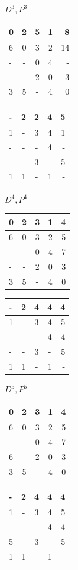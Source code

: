 \documentclass[a4paper,12pt]{article}
\begin{document}
$D^3, P^3$

\begin{tabular}{ | l | c | c | c | r | }
  \hline
  0 & 2 & 5 & 1 & 8 \\ \hline
  6 & 0 & 3 & 2 & 14 \\ \hline
  - & - & 0 & 4 & - \\ \hline
  - & - & 2 & 0 & 3 \\ \hline
  3 & 5 & - & 4 & 0 \\ \hline
\end{tabular}
\quad
\begin{tabular}{ | l | c | c | c | r | }
  \hline
  - & 2 & 2 & 4 & 5 \\ \hline
  1 & - & 3 & 4 & 1 \\ \hline
  - & - & - & 4 & - \\ \hline
  - & - & 3 & - & 5 \\ \hline
  1 & 1 & - & 1 & - \\ \hline
\end{tabular}

$D^4, P^4$

\begin{tabular}{ | l | c | c | c | r | }
  \hline
  0 & 2 & 3 & 1 & 4 \\ \hline
  6 & 0 & 3 & 2 & 5 \\ \hline
  - & - & 0 & 4 & 7 \\ \hline
  - & - & 2 & 0 & 3 \\ \hline
  3 & 5 & - & 4 & 0 \\ \hline
\end{tabular}
\quad
\begin{tabular}{ | l | c | c | c | r | }
  \hline
  - & 2 & 4 & 4 & 4 \\ \hline
  1 & - & 3 & 4 & 5 \\ \hline
  - & - & - & 4 & 4 \\ \hline
  - & - & 3 & - & 5 \\ \hline
  1 & 1 & - & 1 & - \\ \hline
\end{tabular}

$D^5, P^5$

\begin{tabular}{ | l | c | c | c | r | }
  \hline
  0 & 2 & 3 & 1 & 4 \\ \hline
  6 & 0 & 3 & 2 & 5 \\ \hline
  - & - & 0 & 4 & 7 \\ \hline
  6 & - & 2 & 0 & 3 \\ \hline
  3 & 5 & - & 4 & 0 \\ \hline
\end{tabular}
\quad
\begin{tabular}{ | l | c | c | c | r | }
  \hline
  - & 2 & 4 & 4 & 4 \\ \hline
  1 & - & 3 & 4 & 5 \\ \hline
  - & - & - & 4 & 4 \\ \hline
  5 & - & 3 & - & 5 \\ \hline
  1 & 1 & - & 1 & - \\ \hline
\end{tabular}
\end{document}
